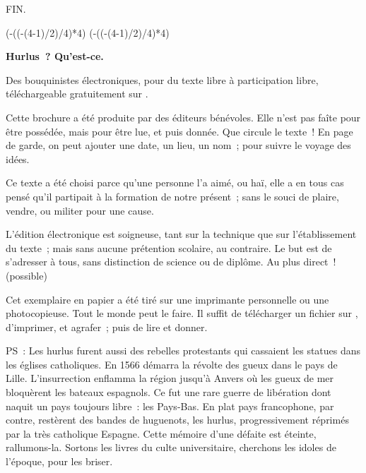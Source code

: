 \documentclass[french,twoside]{book} %
\def\truncdiv#1#2{((#1-(#2-1)/2)/#2)}
\def\moduloop#1#2{(#1-\truncdiv{#1}{#2}*#2)}
\def\modulo#1#2{\number\numexpr\moduloop{#1}{#2}\relax}
\begin{document}
\begin{center}
\noindent \centerline{FIN.}
\end{center}

 


\ifbooklet
  \pagestyle{empty}
  \clearpage
  \ifnum\modulo{\value{page}}{4}=0 \hbox{}\newpage\hbox{}\newpage\fi
  \ifnum\modulo{\value{page}}{4}=1 \hbox{}\newpage\hbox{}\newpage\fi


  \hbox{}\newpage
  \ifodd\value{page}\hbox{}\newpage\fi
  {\centering\color{rubric}\bfseries\noindent\large
    Hurlus ? Qu’est-ce.\par
    \bigskip
  }
  \noindent Des bouquinistes électroniques, pour du texte libre à participation libre,
  téléchargeable gratuitement sur \href{https://hurlus.fr}{}.\par
  \bigskip
  \noindent Cette brochure a été produite par des éditeurs bénévoles.
  Elle n’est pas faîte pour être possédée, mais pour être lue, et puis donnée.
  Que circule le texte !
  En page de garde, on peut ajouter une date, un lieu, un nom ; pour suivre le voyage des idées.
  \par

  Ce texte a été choisi parce qu’une personne l’a aimé,
  ou haï, elle a en tous cas pensé qu’il partipait à la formation de notre présent ;
  sans le souci de plaire, vendre, ou militer pour une cause.
  \par

  L’édition électronique est soigneuse, tant sur la technique
  que sur l’établissement du texte ; mais sans aucune prétention scolaire, au contraire.
  Le but est de s’adresser à tous, sans distinction de science ou de diplôme.
  Au plus direct ! (possible)
  \par

  Cet exemplaire en papier a été tiré sur une imprimante personnelle
   ou une photocopieuse. Tout le monde peut le faire.
  Il suffit de
  télécharger un fichier sur \href{https://hurlus.fr}{},
  d’imprimer, et agrafer ; puis de lire et donner.\par

  \bigskip

  \noindent PS : Les hurlus furent aussi des rebelles protestants qui cassaient les statues dans les églises catholiques. En 1566 démarra la révolte des gueux dans le pays de Lille. L’insurrection enflamma la région jusqu’à Anvers où les gueux de mer bloquèrent les bateaux espagnols.
  Ce fut une rare guerre de libération dont naquit un pays toujours libre : les Pays-Bas.
  En plat pays francophone, par contre, restèrent des bandes de huguenots, les hurlus, progressivement réprimés par la très catholique Espagne.
  Cette mémoire d’une défaite est éteinte, rallumons-la. Sortons les livres du culte universitaire, cherchons les idoles de l’époque, pour les briser.
\fi
\end{document}
